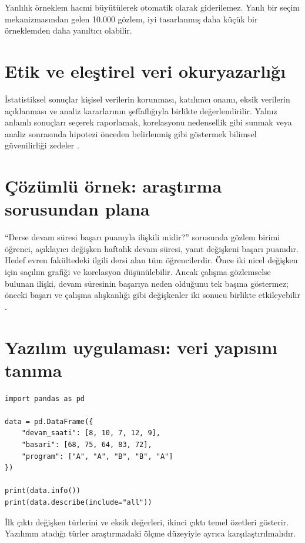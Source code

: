 \begin{researchbox}
Yanlılık örneklem hacmi büyütülerek otomatik olarak giderilemez. Yanlı bir
seçim mekanizmasından gelen 10.000 gözlem, iyi tasarlanmış daha küçük bir
örneklemden daha yanıltıcı olabilir.
\end{researchbox}

\section{Etik ve eleştirel veri okuryazarlığı}

İstatistiksel sonuçlar kişisel verilerin korunması, katılımcı onamı, eksik
verilerin açıklanması ve analiz kararlarının şeffaflığıyla birlikte
değerlendirilir. Yalnız anlamlı sonuçları seçerek raporlamak, korelasyonu
nedensellik gibi sunmak veya analiz sonrasında hipotezi önceden belirlenmiş
gibi göstermek bilimsel güvenilirliği zedeler
\citep{asaethics2022,appelbaum2018}.

\section{Çözümlü örnek: araştırma sorusundan plana}

``Derse devam süresi başarı puanıyla ilişkili midir?'' sorusunda gözlem birimi
öğrenci, açıklayıcı değişken haftalık devam süresi, yanıt değişkeni başarı
puanıdır. Hedef evren fakültedeki ilgili dersi alan tüm öğrencilerdir. Önce
iki nicel değişken için saçılım grafiği ve korelasyon düşünülebilir. Ancak
çalışma gözlemselse bulunan ilişki, devam süresinin başarıya neden olduğunu
tek başına göstermez; önceki başarı ve çalışma alışkanlığı gibi değişkenler
iki sonucu birlikte etkileyebilir \citep{shadish2002}.

\section{Yazılım uygulaması: veri yapısını tanıma}

\begin{softwarebox}
\begin{lstlisting}
import pandas as pd

data = pd.DataFrame({
    "devam_saati": [8, 10, 7, 12, 9],
    "basari": [68, 75, 64, 83, 72],
    "program": ["A", "A", "B", "B", "A"]
})

print(data.info())
print(data.describe(include="all"))
\end{lstlisting}
İlk çıktı değişken türlerini ve eksik değerleri, ikinci çıktı temel özetleri
gösterir. Yazılımın atadığı türler araştırmadaki ölçme düzeyiyle ayrıca
karşılaştırılmalıdır.
\end{softwarebox}

